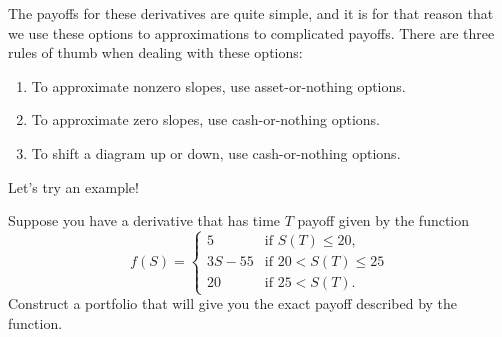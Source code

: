 \documentclass{ximera}
\begin{document}
The payoffs for these derivatives are quite simple, and it is for that reason that we use these options to approximations to complicated payoffs. There are three rules of thumb when dealing with these options:
\begin{enumerate}
\item To approximate nonzero slopes, use asset-or-nothing options.
\item To approximate zero slopes, use cash-or-nothing options.
\item To shift a diagram up or down, use cash-or-nothing options.
\end{enumerate}

Let's try an example!

\begin{example}
Suppose you have a derivative that has time $T$ payoff given by the function
	\begin{equation*}
	f(S)=
		\begin{cases}
		5& \text{if }S(T)\leq20,\\
		3S-55& \text{if } 20<S(T)\leq 25\\
		20 & \text{if }25<S(T).
		\end{cases}
	\end{equation*}
Construct a portfolio that will give you the exact payoff described by the function.
\end{example}
\end{document}
